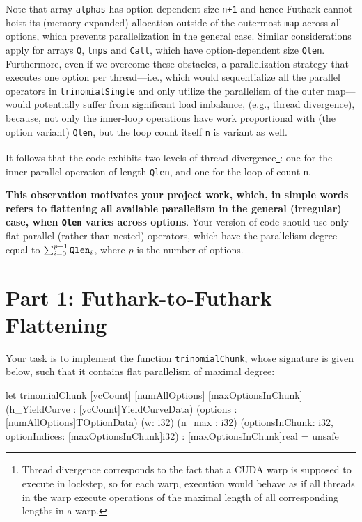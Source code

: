 \documentclass[a4paper,11pt]{article}
\begin{document}
Note that array {\tt alphas} has option-dependent size {\tt n+1}
and hence Futhark cannot hoist its (memory-expanded) allocation
outside of the outermost {\tt map} across all options, which
prevents parallelization in the general case. Similar
considerations apply for arrays {\tt Q}, {\tt tmps} and {\tt Call},
which have option-dependent size {\tt Qlen}.
%
Furthermore, even if we overcome these obstacles, a parallelization
strategy that executes one option per thread---i.e., which would
sequentialize all the parallel operators in {\tt trinomialSingle}
and only utilize the parallelism of the outer map---would potentially 
suffer from significant load imbalance, (e.g., thread divergence), 
because, not only the inner-loop operations have work proportional
with (the option variant) {\tt Qlen}, but the loop count itself {\tt n} 
is variant as well.  

It follows that the code exhibits two levels of thread divergence\footnote{
Thread divergence corresponds to the fact that a CUDA warp is supposed to
execute in lockstep, so for each warp, execution would behave as if all
threads in the warp execute operations of the maximal length of all
corresponding lengths in a warp.
}: 
one for the inner-parallel operation of length {\tt Qlen}, and one
for the loop of count {\tt n}.

\textbf{This observation motivates your project work, which, in simple words
refers to flattening all available parallelism in the general 
(irregular) case, when {\tt Qlen} varies across options}. Your
version of code should use only flat-parallel (rather than nested) operators,
which have the parallelism degree equal to $\sum_{i=0}^{p-1} \mbox{\tt Qlen}_i$,
where $p$ is the number of options. 

\section{Part 1: Futhark-to-Futhark Flattening}

Your task is to implement the function {\tt trinomialChunk},
whose signature is given below, such that it contains flat
parallelism of maximal degree:

\begin{fancycode}
let trinomialChunk [ycCount] [numAllOptions] [maxOptionsInChunk]
                   (h_YieldCurve : [ycCount]YieldCurveData)
                   (options : [numAllOptions]TOptionData) 
                   (w: i32)
                   (n_max : i32)
                   (optionsInChunk: i32, optionIndices: [maxOptionsInChunk]i32)
                 : [maxOptionsInChunk]real = unsafe
\end{fancycode}
\end{document}
